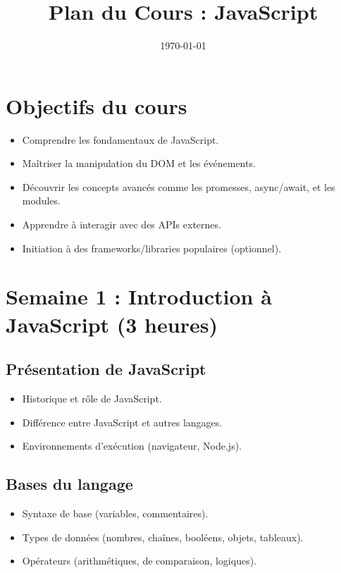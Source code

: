 \documentclass[12pt]{article}
\begin{document}
\vspace*{0.3cm} %
\begin{center}
    \title{Plan du Cours : JavaScript}
    \date{\today}
\end{center}

\section*{Objectifs du cours}
\begin{itemize}
    \item Comprendre les fondamentaux de JavaScript.
    \item Maîtriser la manipulation du DOM et les événements.
    \item Découvrir les concepts avancés comme les promesses, async/await, et les modules.
    \item Apprendre à interagir avec des APIs externes.
    \item Initiation à des frameworks/libraries populaires (optionnel).
\end{itemize}

\section*{Semaine 1 : Introduction à JavaScript (3 heures)}
\subsection*{Présentation de JavaScript }
\begin{itemize}
    \item Historique et rôle de JavaScript.
    \item Différence entre JavaScript et autres langages.
    \item Environnements d'exécution (navigateur, Node.js).
\end{itemize}

\subsection*{Bases du langage }
\begin{itemize}
    \item Syntaxe de base (variables, commentaires).
    \item Types de données (nombres, chaînes, booléens, objets, tableaux).
    \item Opérateurs (arithmétiques, de comparaison, logiques).
\end{itemize}
\end{document}
